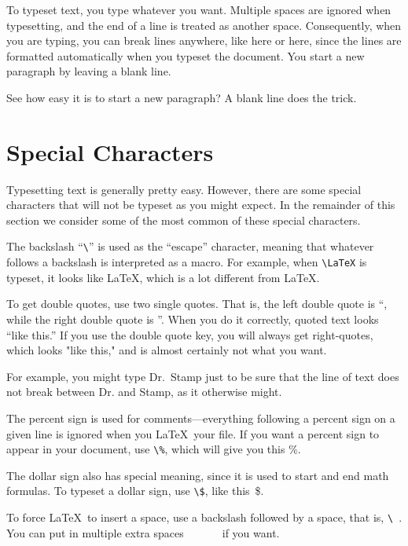 To typeset text, you type whatever you want. Multiple spaces are
ignored                           when typesetting, and
the end of a line is treated as another space.
Consequently, when you are typing, you can break lines anywhere, like here
or here,
since the lines are formatted automatically when you typeset the document.
You start a new paragraph by leaving a blank line.

See how easy it is to start a new paragraph? A blank line does the trick.


\section{Special Characters}

Typesetting text is generally pretty easy. However, there are some special
characters that will not be typeset as you might expect. In the remainder of this
section we consider some of the most common of these
special characters. 

The backslash ``\verb+\+'' is used 
as the ``escape'' character, meaning that
whatever follows a backslash is interpreted as a macro.
For example, when \verb+\LaTeX+ is typeset, it looks like \LaTeX, which 
is a lot different from LaTeX.

To get double quotes, use two single quotes. That is, the left double quote is ``, while the right double
quote is ''. When you do it correctly, quoted text looks ``like this.''
If you use the double quote key, you will always get right-quotes, which looks "like this," and is
almost certainly not what you want.

For example, you might type Dr.~Stamp just to be sure that the line of text
does not break between Dr. and Stamp, as it otherwise might.

The percent sign is used for comments---everything following a percent sign 
on a given line is ignored when you \LaTeX\ your file. %
If you want a percent sign to appear in your document, use \verb+\%+, 
which will give you this \%.

The dollar sign also has special meaning, since it is used to start and end
math formulas. To typeset a dollar sign, use \verb+\$+, like this~\$.

To force \LaTeX\ to insert a space, use a backslash followed by
a space, that is, \verb+\ +. You can put in multiple extra spaces\ \ \ \ \ \ \ if you want.

